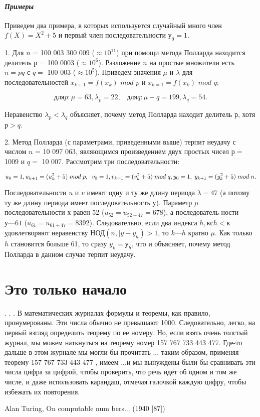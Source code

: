 \documentclass{mai_book}
\begin{document}
	\paragraph{{\it Примеры}}
	\noindent
	
	Приведем два примера, в которых используется случайный много	член $f(X )= X^2 + 5$  и первый член последовательности $у_0 = 1$.
	
	1. Для $n$ = 100 003 300 009 ($\approx 10^{11}$) при помощи метода Полларда	находится делитель $р$ = 100 0003 ($\approx 10^6$). Разложение $n$ на простые	множители есть $n = pq$ с $q =$ 100 003 ($\approx 10^5$). Приведем значения $\mu$ и $\lambda$	для последовательностей $x_{k+1} =  f(x_k)$ $mod$ $p$ и $x_{k=1} = f(x_k)$ $mod$ $q$:

	
	\begin{equation}
	\text{для} p: \mu = 63, \lambda_p=22, \;\;\; \text{для} q:\mu-q=199, \lambda_q = 54.
	\end{equation}
	
	\noindent
	Неравенство $\lambda_p	< \lambda_q$ объясняет, почему метод Полларда находит дели­тель $р$, хотя $р > q$.

	
	2. Метод Полларда (с параметрами, приведенными выше) терпит	неудачу с числом $n$ = 10 097 063, являющимся произведением двух простых чисел $р =$ 1009 и $q =$ 10 007. Рассмотрим три последовательности:
	
	\begin{equation}
	u_0 =1, u_{k+1} = (u_{k}^2+5)\;mod\;p, \;\; v_0 = 1, v_{k=1} = (v_{k}^2 + 5)\;mod\;q, \\ y_0=1,\;y_{k+1} = (y_{k}^2 + 5)\; mod \; n.
	\end{equation}
	
	\pagebreak
	Последовательности $u$ и $v$ имеют одну и ту же длину периода $\lambda = 47$	(а потому ту же длину периода имеет последовательность $у$). Параметр $\mu$ последовательности $х$ равен 52 ($u_{52} = u_{52+47} = 678$), а последователь­	ности $у — 61$ ($u_{61} = u_{61+47} = 8392$). Следовательно, если два индекса	$h, к с h < к$ удовлетворяют неравенству НОД$(n, |y-y_h) > 1$, то $k — h$	кратно $\mu$. Как только $h$ становится больше 61, то сразу $y_k = у_h$, что и	объясняет, почему метод Полларда в данном случае терпит неудачу.
	
	\section{Это только начало}
	\epigraph{. . . В математических журналах формулы и теоремы, как правило, пронумерованы. Эти числа обычно не превышают 1000.	Следовательно, легко, на первый взгляд определить теорему по ее номеру. Но, если взять очень толстый журнал, мы можем на­ткнуться на теорему номер 157 767 733 443 477. Где-то дальше в	этом журнале мы могли бы прочитать \guillemotleft ... таким образом, при­меняя теорему 157 767 733 443 477 , имеем ...\guillemotright и мы вынуждены	были бы сравнивать эти числа цифра за цифрой, чтобы проверить, что речь идет об одном и том же числе, и даже использовать карандаш, отмечая галочкой каждую цифру, чтобы избежать их повторения. 
	} {Alan Turing, On computable num bers... (1940 [87])}
\end{document}
